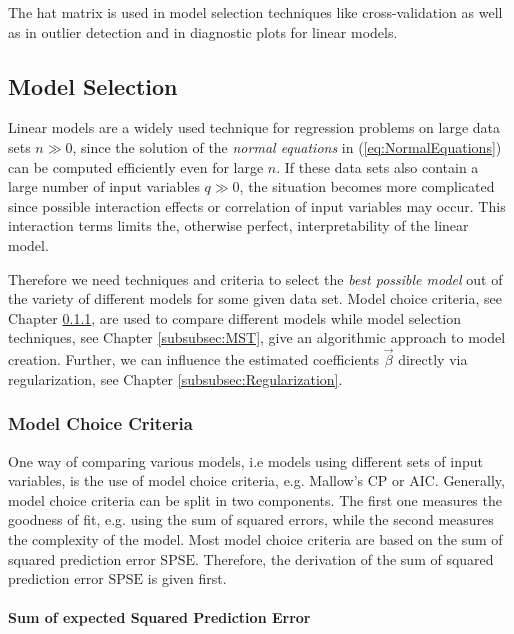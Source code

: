 \documentclass[10pt,a4paper]{report}
\newcommand{\subsubsubsection}[1]{\paragraph{#1}\mbox{}\\}
\begin{document}
The hat matrix is used in model selection techniques like cross-validation as well as in outlier detection and in diagnostic plots for linear models.

\subsection{Model Selection}

Linear models are a widely used technique for regression problems on large data sets $n \gg 0$, since the solution of the \emph{normal equations} in (\ref{eq:NormalEquations}) can be computed efficiently even for large $n$. If these data sets also contain a large number of input variables $q \gg 0$, the situation becomes more complicated since possible interaction effects or correlation of input variables may occur. This interaction terms limits the, otherwise perfect, interpretability of the linear model. 

Therefore we need techniques and criteria to select the \emph{best possible model} out of the variety of different models for some given data set. Model choice criteria, see Chapter \ref{subsubsec:MCC}, are used to compare different models while model selection techniques, see Chapter \ref{subsubsec:MST}, give an algorithmic approach to model creation. Further, we can influence the estimated coefficients $\vec{\beta}$ directly via regularization, see Chapter \ref{subsubsec:Regularization}. 

\subsubsection{Model Choice Criteria} \label{subsubsec:MCC}

One way of comparing various models, i.e models using different sets of input variables, is the use of model choice criteria, e.g. Mallow's CP or AIC. Generally, model choice criteria can be split in two components. The first one measures the goodness of fit, e.g. using the sum of squared errors, while the second measures the complexity of the model. Most model choice criteria are based on the sum of squared prediction error $\text{SPSE}$. Therefore, the derivation of the sum of squared prediction error $\text{SPSE}$ is given first. 

\subsubsubsection{Sum of expected Squared Prediction Error}
\end{document}
